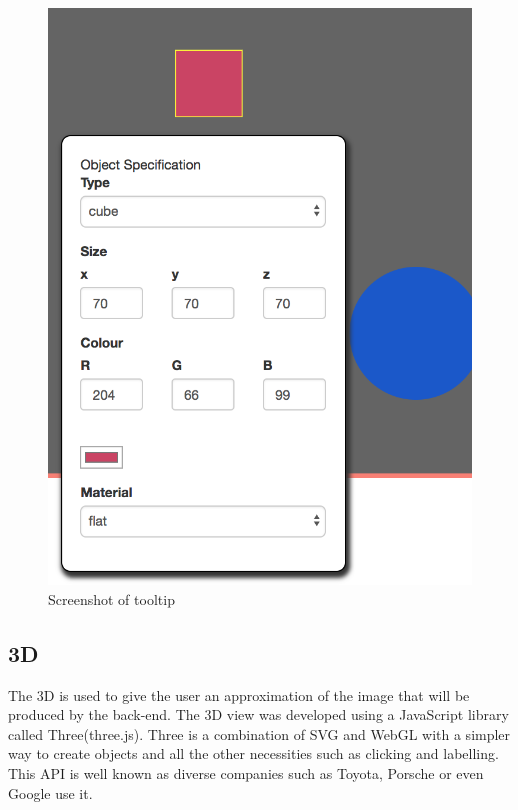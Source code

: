 \documentclass[a4paper]{report}
\begin{document}
	\begin{figure}[ht!]
		\centering
		\includegraphics[scale=0.30]{tooltip.png}
		\caption{Screenshot of tooltip}
		\label{fig:tooltip}
	\end{figure}
	
	\subsection{3D}
	The 3D is used to give the user an approximation of the image that will be produced by the back-end. The 3D view was developed using a JavaScript library called Three(three.js)\cite{three.js_three.js_2018}. Three is a combination of SVG and WebGL with a simpler way to create objects and all the other necessities such as clicking and labelling. This API is well known as diverse companies\cite{three.js_three.js_2018} such as Toyota, Porsche or even Google \cite{google_rubiks_2014} use it.\newline
	
\end{document}
